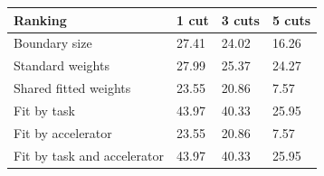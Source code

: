 \begin{tabular}{@{}llll@{}}
\toprule
Ranking & 1 cut & 3 cuts & 5 cuts \\
\midrule
Boundary size & 27.41 & 24.02 & 16.26 \\
Standard weights & 27.99 & 25.37 & 24.27 \\
Shared fitted weights & 23.55 & 20.86 & 7.57 \\
Fit by task & 43.97 & 40.33 & 25.95 \\
Fit by accelerator & 23.55 & 20.86 & 7.57 \\
Fit by task and accelerator & 43.97 & 40.33 & 25.95 \\
\bottomrule
\end{tabular}
